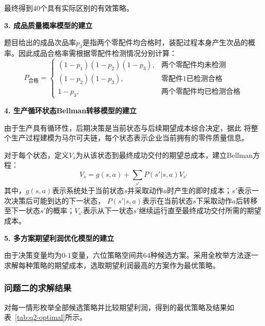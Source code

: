 \documentclass[withoutpreface,bwprint]{cumcmthesis}
\numberwithin{equation}{section}
\begin{document}
最终得到$40$个具有实际区别的有效策略。

\textbf{3. 成品质量概率模型的建立}

题目给出的成品次品率$p_3$是指两个零配件均合格时，装配过程本身产生次品的概率。因此成品合格率需根据零配件检测情况分别计算：
\begin{equation}
P_{\text{合格}} =
\begin{cases}
(1-p_1)(1-p_2)(1-p_3), & \text{两个零配件均未检测} \\
(1-p_2)(1-p_3), & \text{零配件1已检测合格} \\
1-p_3, & \text{两个零配件均已检测合格}
\end{cases}
\end{equation}

\textbf{4. 生产循环状态Bellman转移模型的建立}

由于生产具有循环性，后期决策是当前状态与后续期望成本综合决定，据此
将整个生产过程建模为马尔可夫链，每个状态表示企业当前拥有的零件质量信息。

对于每个状态，定义$V_s$为从该状态到最终成功交付的期望总成本，建立Bellman方程：
\begin{equation}
V_s=g(s,a)+\sum_{s'}P(s'|s,a)V_{s'}
\end{equation}
其中，$g(s,a)$表示系统处于当前状态$s$并采取动作$a$时产生的即时成本；$s'$表示一次决策后可能到达的下一状态，
$P(s'|s,a)$表示在当前状态$s$下采取动作$a$后转移至下一状态$s'$的概率；$V_{s'}$表示从下一状态$s'$继续运行直至最终成功交付所需的期望成本。


\textbf{5. 多方案期望利润优化模型的建立}

由于决策变量均为$0$-$1$变量，六位策略空间共$64$种候选方案。采用全枚举方法逐一求解每种策略的期望成本，选取期望利润最高的方案作为最优策略。
















\subsubsection{问题二的求解结果}



对每一情形枚举全部候选策略并比较期望利润，得到的最优策略及结果如表~\ref{tab:q2-optimal}所示。
\end{document}

